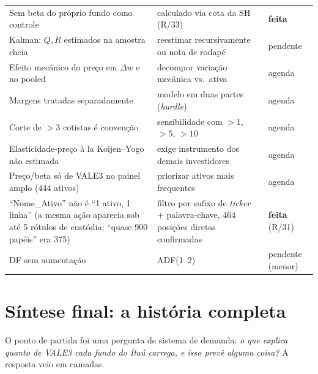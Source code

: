 \documentclass[11pt,a4paper]{article}
\begin{document}
\begin{center}
\begin{tabular}{@{}p{5.2cm}p{5.7cm}l@{}}
Sem beta do próprio fundo como controle & calculado via cota da SH (R/33) & \textbf{feita} \\
Kalman: $Q,R$ estimados na amostra cheia & reestimar recursivamente ou nota de rodapé & pendente \\
Efeito mecânico do preço em $\Delta w$ e no pooled & decompor variação mecânica vs.\ ativa & agenda \\
Margens tratadas separadamente & modelo em duas partes (\emph{hurdle}) & agenda \\
Corte de $>3$ cotistas é convenção & sensibilidade com $>1$, $>5$, $>10$ & agenda \\
Elasticidade-preço à la Koijen--Yogo não estimada & exige instrumento dos demais investidores & agenda \\
Preço/beta só de VALE3 no painel amplo (444 ativos) & priorizar ativos mais frequentes & agenda \\
``Nome\_Ativo'' não é ``1 ativo, 1 linha'' (a mesma ação aparecia sob até 5 rótulos de custódia; ``quase 900 papéis'' era 375) & filtro por sufixo de \emph{ticker} + palavra-chave, 464 posições diretas confirmadas & \textbf{feita} (R/31) \\
DF sem aumentação & ADF(1--2) & pendente (menor) \\
\bottomrule
\end{tabular}
\end{center}

\section{Síntese final: a história completa}

O ponto de partida foi uma pergunta de sistema de demanda: \emph{o que explica quanto de VALE3
cada fundo do Itaú carrega, e isso prevê alguma coisa?} A resposta veio em camadas.
\end{document}
